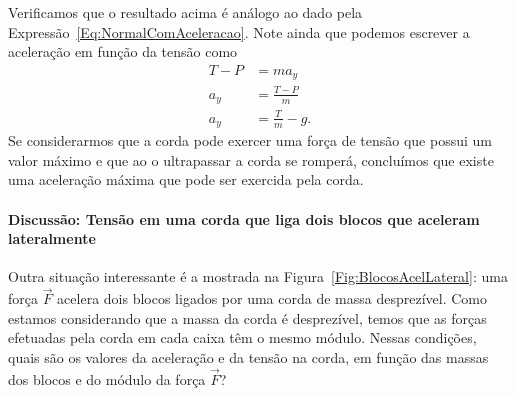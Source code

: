 \noindent{}Verificamos que o resultado acima é análogo ao dado pela Expressão~\eqref{Eq:NormalComAceleracao}. Note ainda que podemos escrever a aceleração em função da tensão como
\begin{align}
    T - P &= m a_y \\
    a_y &= \frac{T - P}{m} \\
    a_y &= \frac{T}{m} - g.
\end{align}
%
Se considerarmos que a corda pode exercer uma força de tensão que possui um valor máximo e que ao o ultrapassar a corda se romperá, concluímos que existe uma aceleração máxima que pode ser exercida pela corda. 

\paragraph{Discussão: Tensão em uma corda que liga dois blocos que aceleram lateralmente}
\label{Par:Discussao:TensaoEmCordaQueLigaDoisBlocos}

Outra situação interessante é a mostrada na Figura~\ref{Fig:BlocosAcelLateral}: uma força $\vec{F}$ acelera dois blocos ligados por uma corda de massa desprezível. Como estamos considerando que a massa da corda é desprezível, temos que as forças efetuadas pela corda em cada caixa têm o mesmo módulo. Nessas condições, quais são os valores da aceleração e da tensão na corda, em função das massas dos blocos e do módulo da força $\vec{F}$?

